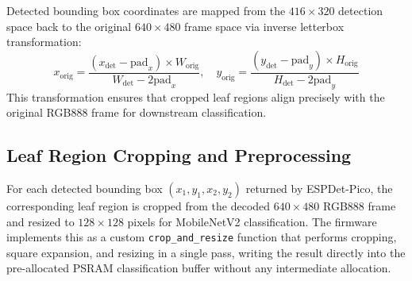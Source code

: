 Detected bounding box coordinates are mapped from the $416 \times 320$ detection space back to the original $640 \times 480$ frame space via inverse letterbox transformation:
\begin{equation}
x_{\text{orig}} = \frac{(x_{\text{det}} - \text{pad}_x) \times W_{\text{orig}}}{W_{\text{det}} - 2\text{pad}_x}, \quad
y_{\text{orig}} = \frac{(y_{\text{det}} - \text{pad}_y) \times H_{\text{orig}}}{H_{\text{det}} - 2\text{pad}_y}
\end{equation}
This transformation ensures that cropped leaf regions align precisely with the original RGB888 frame for downstream classification.

\subsection{Leaf Region Cropping and Preprocessing}
\label{subsec:region_cropping}

For each detected bounding box $(x_1, y_1, x_2, y_2)$ returned by ESPDet-Pico, the corresponding leaf region is cropped from the decoded $640 \times 480$ RGB888 frame and resized to $128 \times 128$ pixels for MobileNetV2 classification. The firmware implements this as a custom \texttt{crop\_and\_resize} function that performs cropping, square expansion, and resizing in a single pass, writing the result directly into the pre-allocated PSRAM classification buffer without any intermediate allocation.


